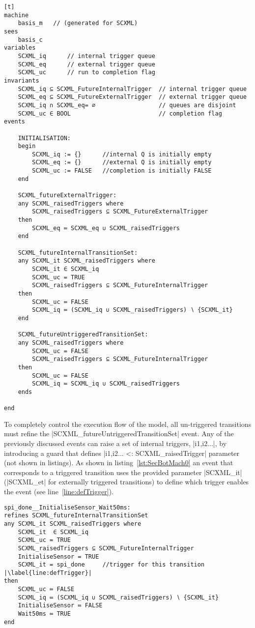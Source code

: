 \begin{lstfloat}
\begin{lstlisting}[caption={Snippet of abstract basis machine}, label={lst:BasisMachine},language=Event-B, escapechar=|, frame=single][t]
machine 
	basis_m   // (generated for SCXML)
sees 
	basis_c 
variables
	SCXML_iq	  // internal trigger queue
	SCXML_eq	  // external trigger queue
	SCXML_uc	  // run to completion flag
invariants
	SCXML_iq ⊆ SCXML_FutureInternalTrigger	// internal trigger queue
	SCXML_eq ⊆ SCXML_FutureExternalTrigger	// external trigger queue
	SCXML_iq ∩ SCXML_eq= ∅					// queues are disjoint
	SCXML_uc ∈ BOOL							// completion flag
events

	INITIALISATION: 
	begin
		SCXML_iq := {}		//internal Q is initially empty
		SCXML_eq := {}		//external Q is initially empty
		SCXML_uc := FALSE	//completion is initially FALSE
	end

	SCXML_futureExternalTrigger: 
	any SCXML_raisedTriggers where
		SCXML_raisedTriggers ⊆ SCXML_FutureExternalTrigger 
	then
		SCXML_eq ≔ SCXML_eq ∪ SCXML_raisedTriggers 
	end
	
	SCXML_futureInternalTransitionSet: 
	any SCXML_it SCXML_raisedTriggers where
		SCXML_it ∈ SCXML_iq 
		SCXML_uc = TRUE 
		SCXML_raisedTriggers ⊆ SCXML_FutureInternalTrigger 
	then
		SCXML_uc ≔ FALSE 
		SCXML_iq ≔ (SCXML_iq ∪ SCXML_raisedTriggers) ∖ {SCXML_it} 
	end

	SCXML_futureUntriggeredTransitionSet: 
	any SCXML_raisedTriggers where
		SCXML_uc = FALSE
		SCXML_raisedTriggers ⊆ SCXML_FutureInternalTrigger
	then
		SCXML_uc ≔ FALSE 
		SCXML_iq ≔ SCXML_iq ∪ SCXML_raisedTriggers 
	ends

end
\end{lstlisting}
\end{lstfloat}
To completely control the execution flow of the model, all un-triggered transitions must refine the |SCXML_futureUntriggeredTransitionSet| event. 
Any of the previously discussed events can raise a set of internal triggers, |{i1,i2...}|, by introducing a guard that defines |{i1,i2...} <: SCXML_raisedTrigger| parameter (not shown in listings). 
As shown in listing~\ref{lst:SecBotMach0} an event that corresponds to a triggered transition uses the provided parameter |SCXML_it| (|SCXML_et| for externally triggered transitions) to define which trigger enables the event (see line~\ref{line:defTrigger}).

\begin{lstlisting}[caption={Event-B event corresponding to internal triggered transition to \textbf{Wait50ms} state in refinement level 1 shown in Fig.~\ref{fig:ASIC}}, label={lst:SecBotMach0},language=Event-B, escapechar=|, frame=single]
spi_done__InitialiseSensor_Wait50ms:	
refines SCXML_futureInternalTransitionSet 
any SCXML_it SCXML_raisedTriggers where
	SCXML_it  ∈ SCXML_iq 
	SCXML_uc = TRUE
	SCXML_raisedTriggers ⊆ SCXML_FutureInternalTrigger
	InitialiseSensor = TRUE
	SCXML_it = spi_done  	//trigger for this transition |\label{line:defTrigger}|
then
	SCXML_uc ≔ FALSE
	SCXML_iq ≔ (SCXML_iq ∪ SCXML_raisedTriggers) ∖ {SCXML_it}
	InitialiseSensor ≔ FALSE
	Wait50ms ≔ TRUE
end
\end{lstlisting}

